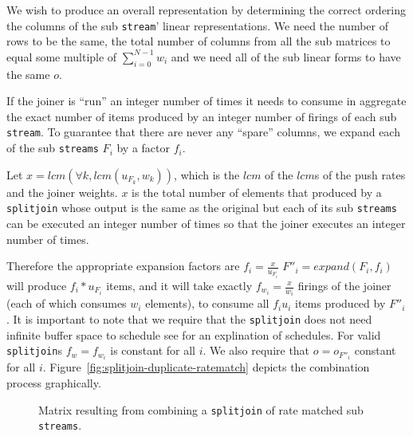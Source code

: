 We wish to produce an overall representation by determining the correct
ordering the columns of the sub {\tt stream}' linear representations. We
need the number of rows to be the same, the total number of columns 
from all the sub matrices to equal some multiple of $\sum_{i=0}^{N-1}w_i$
and we need all of the sub linear forms to have the same $o$. 

If the joiner is ``run'' an integer number of times it needs to consume in aggregate
the exact number of items produced by an integer number of firings of
each sub {\tt stream}. To guarantee that there are never any ``spare'' columns,
we expand each of the sub {\tt streams} $F_i$ by a factor $f_i$.

Let $x=lcm(\forall k, lcm(u_{F_k},w_k))$, which is the $lcm$ of the $lcm$s of 
the push rates and the joiner weights. $x$ is the total number of elements that 
produced by a {\tt splitjoin} whose output is the same as the original but each 
of its sub {\tt streams} can be executed an integer number of times so that 
the joiner executes an integer number of times.

Therefore the appropriate expansion factors are  $f_i=\frac{x}{u_{F_i}}$ 
$F''_i = expand(F_i,f_i)$ will produce $f_i*u_{F_i}$ items, and it will take 
exactly $f_{w_i}=\frac{x}{w_i}$ firings of the 
joiner (each of which consumes $w_i$ elements), to consume all $f_iu_i$ items produced by $F''_i$.
It is important to note that we require that the {\tt splitjoin} does not need
infinite buffer space to schedule see \cite{karczma-thesis} for an explination of schedules. 
For valid {\tt splitjoin}s $f_w=f_{w_i}$ is constant for all $i$. We also require that $o=o_{F''_i}$
constant for all $i$. Figure~\ref{fig:splitjoin-duplicate-ratematch} depicts the 
combination process graphically.

\begin{figure}
\center
\epsfxsize=3.0in
\caption{Matrix resulting from combining a {\tt splitjoin} of rate matched sub {\tt streams}.}
\label{fig:splitjoin-duplicate-matrix}
\end{figure}

